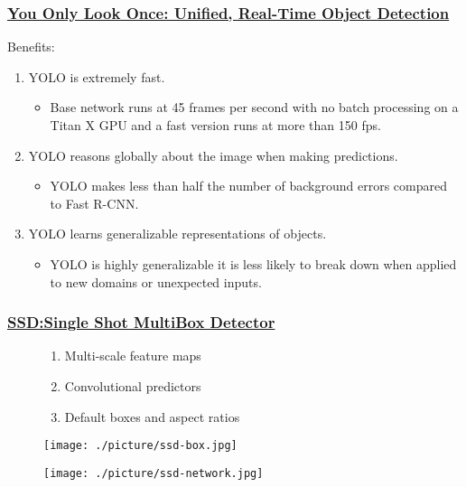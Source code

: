 \documentclass{beamer}
\begin{document}
\begin{frame}
  \frametitle{\href{https://arxiv.org/abs/1506.02640}
    {You Only Look Once: Unified, Real-Time Object Detection}}
  Benefits: 
  \begin{enumerate}
  \item YOLO is extremely fast.
    \begin{itemize}
    \item Base network runs at 45 frames per second with no batch processing on a Titan X GPU and
      a fast version runs at more than 150 fps.
    \end{itemize}
  \item YOLO reasons globally about the image when making predictions.
    \begin{itemize}
    \item YOLO makes less than half the number of background errors compared to Fast R-CNN.
    \end{itemize}
  \item YOLO learns generalizable representations of objects.
    \begin{itemize}
    \item YOLO is highly generalizable it is less likely to break down when applied to new domains
      or unexpected inputs.
    \end{itemize}
  \end{enumerate}
\end{frame}  

\begin{frame}
  \frametitle{\href{https://arxiv.org/abs/1512.02325}
    {SSD:Single Shot MultiBox Detector}}
  \begin{figure}[ht]
    \centering
    \begin{minipage}{.5\textwidth}
      \begin{enumerate}
      \item Multi-scale feature maps 
      \item Convolutional predictors 
      \item Default boxes and aspect ratios
      \end{enumerate}
    \end{minipage}%
    \begin{minipage}{.5\textwidth}
      \centering
      \texttt{[image: ./picture/ssd-box.jpg]}
    \end{minipage}
  \end{figure}
  \begin{figure}[!htb]
    \centering
    \texttt{[image: ./picture/ssd-network.jpg]}
  \end{figure}

\end{frame}
\end{document}
